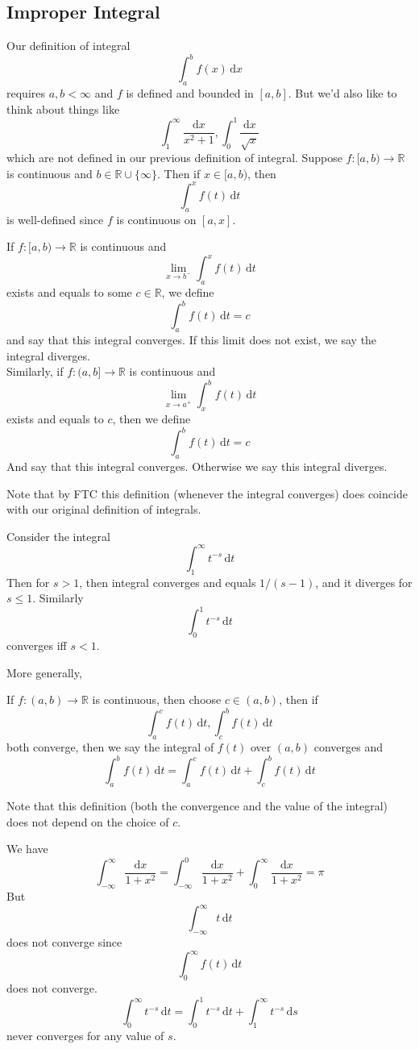 \subsection{Improper Integral}
Our definition of integral
$$\int_a^bf(x)\,\mathrm dx$$
requires $a,b<\infty$ and $f$ is defined and bounded in $[a,b]$.
But we'd also like to think about things like
$$\int_1^\infty\frac{\mathrm dx}{x^2+1},\int_0^1\frac{\mathrm dx}{\sqrt{x}}$$
which are not defined in our previous definition of integral.
Suppose $f:[a,b)\to\mathbb R$ is continuous and $b\in\mathbb R\cup\{\infty\}$.
Then if $x\in [a,b)$, then
$$\int_a^xf(t)\,\mathrm dt$$
is well-defined since $f$ is continuous on $[a,x]$.
\begin{definition}
    If $f:[a,b)\to\mathbb R$ is continuous and
    $$\lim_{x\to b^-}\int_a^xf(t)\,\mathrm dt$$
    exists and equals to some $c\in\mathbb R$, we define
    $$\int_a^bf(t)\,\mathrm dt=c$$
    and say that this integral converges.
    If this limit does not exist, we say the integral diverges.\\
    Similarly, if $f:(a,b]\to\mathbb R$ is continuous and
    $$\lim_{x\to a^+}\int_x^bf(t)\,\mathrm dt$$
    exists and equals to $c$, then we define
    $$\int_a^bf(t)\,\mathrm dt=c$$
    And say that this integral converges.
    Otherwise we say this integral diverges.
\end{definition}
Note that by FTC this definition (whenever the integral converges) does coincide with our original definition of integrals.
\begin{example}
    Consider the integral
    $$\int_1^\infty t^{-s}\,\mathrm dt$$
    Then for $s>1$, then integral converges and equals $1/(s-1)$, and it diverges for $s\le 1$.
    Similarly
    $$\int_0^1 t^{-s}\,\mathrm dt$$
    converges iff $s<1$.
\end{example}
More generally,
\begin{definition}
    If $f:(a,b)\to\mathbb R$ is continuous, then choose $c\in (a,b)$, then if
    $$\int_a^cf(t)\,\mathrm dt,\int_c^bf(t)\,\mathrm dt$$
    both converge, then we say the integral of $f(t)$ over $(a,b)$ converges and
    $$\int_a^bf(t)\,\mathrm dt=\int_a^cf(t)\,\mathrm dt+\int_c^bf(t)\,\mathrm dt$$
\end{definition}
Note that this definition (both the convergence and the value of the integral) does not depend on the choice of $c$.
\begin{example}
    We have
    $$\int_{-\infty}^\infty\frac{\mathrm dx}{1+x^2}=\int_{-\infty}^0\frac{\mathrm dx}{1+x^2}+\int_{0}^\infty\frac{\mathrm dx}{1+x^2}=\pi$$
    But
    $$\int_{-\infty}^\infty t\,\mathrm dt$$
    does not converge since
    $$\int_0^\infty f(t)\,\mathrm dt$$
    does not converge.
    $$\int_0^\infty t^{-s}\,\mathrm dt=\int_0^1 t^{-s}\,\mathrm dt+\int_1^\infty t^{-s}\,\mathrm ds$$
    never converges for any value of $s$.
\end{example}
